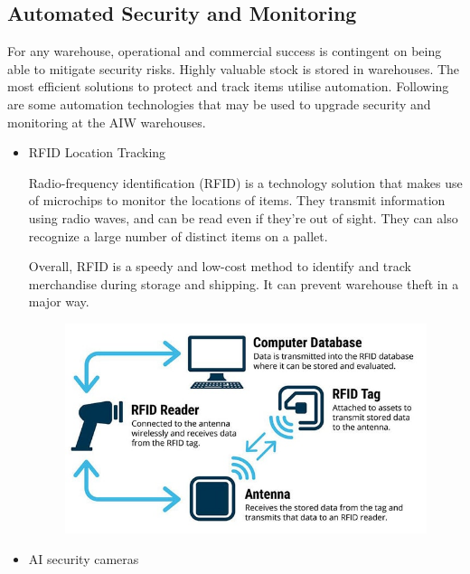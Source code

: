 \documentclass{report}
\begin{document}
\subsection{Automated Security and Monitoring}

For any warehouse, operational and commercial success is contingent on being able to mitigate security risks. Highly valuable stock is stored in warehouses. The most efficient solutions to protect and track items utilise automation. Following are some automation technologies that may be used to upgrade security and monitoring at the AIW warehouses.
\begin{itemize}
    

\item{RFID Location Tracking

Radio-frequency identification (RFID) is a technology solution that makes use of microchips to monitor the locations of items. They transmit information using radio waves, and can be read even if they’re out of sight. They can also recognize a large number of distinct items on a pallet. 

Overall, RFID is a speedy and low-cost method to identify and track merchandise during storage and shipping. It can prevent warehouse theft in a major way.}

\begin{figure}[H]
    
    \centering
    \includegraphics[scale=0.4]{rfid.jpg}
    \caption{}
    
\end{figure}

\item{AI security cameras

}
\end{itemize}
\end{document}
